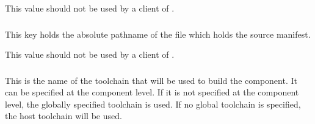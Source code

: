 This value should not be used by a client of \lmsbw.

\subsubsection{}

This key holds the absolute pathname of the file which holds the
source \mtree manifest.

This value should not be used by a client of \lmsbw.

\subsubsection{}

This is the name of the toolchain that will be used to build the
component.  It can be specified at the component level.  If it is not
specified at the component level, the globally specified toolchain is
used.  If no global toolchain is specified, the host toolchain will be
used.
